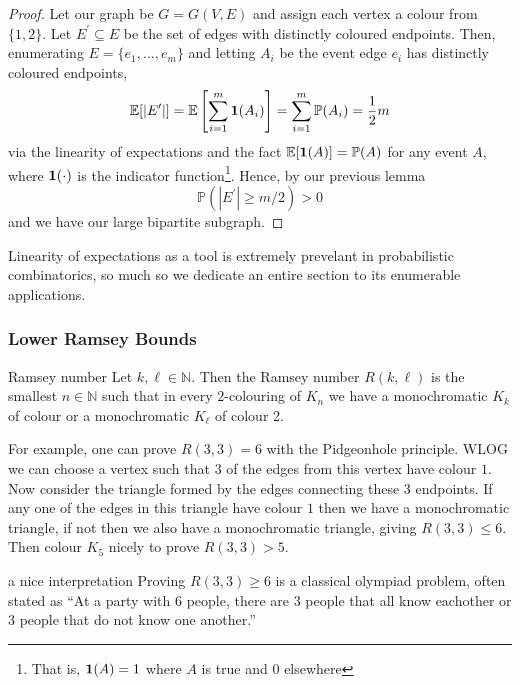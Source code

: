 \documentclass{article}
\begin{document}
\begin{proof}
    Let our graph be $G = G(V, E)$ and assign each vertex a colour from $\{1, 2\}$. Let $E^\prime \subseteq E$ be 
    the set of edges with distinctly coloured endpoints. Then, enumerating $E = \{e_1, \dots, e_m\}$ and letting 
    $A_i$ be the event edge $e_i$ has distinctly coloured endpoints, 
    \[\mathbb{E}[|E^\prime|] = \mathbb{E}\left[\sum_{i = 1}^m{\bf 1}(A_i)\right] = \sum_{i=1}^m \mathbb{P}(A_i) = \frac{1}{2}m\]
    via the linearity of expectations and the fact $\mathbb{E}[{\bf 1}(A)] = \mathbb{P}(A)$ for any event $A$, 
    where ${\bf 1}(\cdot)$ is the indicator function\footnote{That is, ${\bf 1}(A) = 1$ where $A$ is true and $0$ elsewhere}. 
    Hence, by our previous lemma 
    \[\mathbb{P}(|E^\prime| \geq m/2) > 0\] 
    and we have our large bipartite subgraph.
\end{proof}

Linearity of expectations as a tool is extremely prevelant in probabilistic combinatorics, so much so 
we dedicate an entire section to its enumerable applications. \\ 

\subsubsection{Lower Ramsey Bounds}

\begin{definition}[]{Ramsey number}
    Let $k, \ell \in \mathbb{N}$. Then the Ramsey number $R(k, \ell)$ is the smallest $n \in \mathbb{N}$ such that 
    in every $2$-colouring of $K_n$ we have a monochromatic $K_k$ of colour or a monochromatic $K_\ell$ of colour 2.
\end{definition}

For example, one can prove $R(3,3) = 6$ with the Pidgeonhole principle. WLOG we can choose a vertex such that 
$3$ of the edges from this vertex have colour $1$. Now consider the triangle formed by the edges connecting these $3$
endpoints. If any one of the edges in this triangle have colour $1$ then we have a monochromatic triangle, if not 
then we also have a monochromatic triangle, giving $R(3,3) \leq 6$. Then colour $K_5$ nicely to prove $R(3,3) > 5$. 

\begin{remark}[]{a nice interpretation}
    Proving $R(3,3) \geq 6$ is a classical olympiad problem, often stated as ``At a party with 
    $6$ people, there are $3$ people that all know eachother or $3$ people that do not know one another.'' 
\end{remark}
\end{document}
